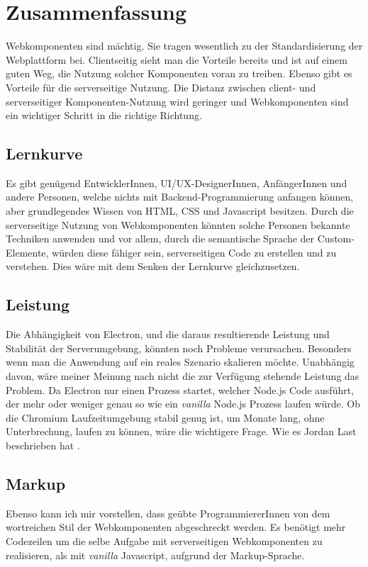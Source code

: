 \chapter{Zusammenfassung}
Webkomponenten sind mächtig. Sie tragen wesentlich zu der Standardisierung der Webplattform bei. Clientseitig sieht man die Vorteile bereits und ist auf einem guten Weg, die Nutzung solcher Komponenten voran zu treiben. Ebenso gibt es Vorteile für die serverseitige Nutzung. Die Distanz zwischen client- und serverseitiger Komponenten-Nutzung wird geringer und Webkomponenten sind ein wichtiger Schritt in die richtige Richtung.

\section{Lernkurve}
Es gibt genügend EntwicklerInnen, UI/UX-DesignerInnen, AnfängerInnen und andere Personen, welche nichts mit Backend-Programmierung anfangen können, aber grundlegendes Wissen von HTML, CSS und Javascript besitzen. Durch die serverseitige Nutzung von Webkomponenten könnten solche Personen bekannte Techniken anwenden und vor allem, durch die semantische Sprache der Custom-Elemente, würden diese fähiger sein, serverseitigen Code zu erstellen und zu verstehen. Dies wäre mit dem Senken der Lernkurve gleichzusetzen.

\section{Leistung}
Die Abhängigkeit von Electron, und die daraus resultierende Leistung und Stabilität der Serverumgebung, könnten noch Probleme verursachen. Besonders wenn man die Anwendung auf ein reales Szenario skalieren möchte. Unabhängig davon, wäre meiner Meinung nach nicht die zur Verfügung stehende Leistung das Problem. Da Electron nur einen Prozess startet, welcher Node.js Code ausführt, der mehr oder weniger genau so wie ein \textit{vanilla} Node.js Prozess laufen würde. Ob die Chromium Laufzeitumgebung stabil genug ist, um Monate lang, ohne Unterbrechung, laufen zu können, wäre die wichtigere Frage. Wie es Jordan Last beschrieben hat \cite{server-side-webcomponents}.

\section{Markup}
Ebenso kann ich mir vorstellen, dass geübte ProgrammiererInnen von dem wortreichen Stil der Webkomponenten abgeschreckt werden. Es benötigt mehr Codezeilen um die selbe Aufgabe mit serverseitigen Webkomponenten zu realisieren, als mit \textit{vanilla} Javascript, aufgrund der Markup-Sprache.

